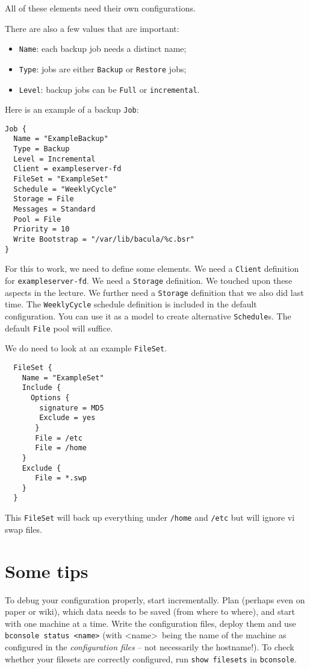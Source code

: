 \documentclass{article}   	%
\begin{document}
All of these elements need their own configurations.

There are also a few values that are important:

\begin{itemize}
	\item \texttt{Name}: each backup job needs a distinct name;
	\item \texttt{Type}: jobs are either \texttt{Backup} or \texttt{Restore} jobs;
	\item \texttt{Level}: backup jobs can be \texttt{Full} or \texttt{incremental}.	
\end{itemize}

Here is an example of a backup \texttt{Job}:

\begin{verbatim}
Job {
  Name = "ExampleBackup"
  Type = Backup
  Level = Incremental
  Client = exampleserver-fd
  FileSet = "ExampleSet"
  Schedule = "WeeklyCycle"
  Storage = File
  Messages = Standard
  Pool = File
  Priority = 10
  Write Bootstrap = "/var/lib/bacula/%c.bsr"
}

\end{verbatim}

For this to work, we need to define some elements. We need a \texttt{Client} definition for \texttt{exampleserver-fd}. We need a \texttt{Storage} definition. We touched upon these aspects in the lecture.  We further need a \texttt{Storage} definition that we also did last time.  The \texttt{WeeklyCycle} schedule definition is included in the default configuration.  You can use it as a model to create alternative \texttt{Schedule}s.
The default \texttt{File} pool will suffice.

We do need to look at an example \texttt{FileSet}.
  
  \begin{verbatim}
  FileSet {
    Name = "ExampleSet"
    Include {
      Options {
        signature = MD5
        Exclude = yes
       }
       File = /etc
       File = /home
    }
    Exclude {
       File = *.swp
    }
  }
  \end{verbatim}
  
This \texttt{FileSet} will back up everything under \texttt{/home} and \texttt{/etc} but will ignore vi swap files.

\section{Some tips}

To debug your configuration properly, start incrementally. Plan (perhaps even on paper or wiki), which data needs to be saved (from where to where), and start with one machine at a time. Write the configuration files, deploy them and use \texttt{bconsole status \textless name\textgreater} (with \textless name\textgreater~being the name of the machine as configured in the \emph{configuration files} -- not necessarily the hostname!). To check whether your filesets are correctly configured, run \texttt{show filesets} in \texttt{bconsole}.
\end{document}
